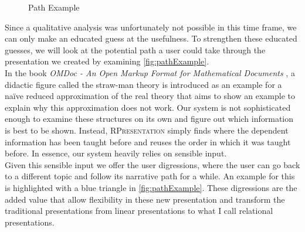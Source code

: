 \documentclass[twoside, 12pt]{article}
\newcommand{\sys}{\textsc{RPresentation}\xspace}
\begin{document}
\begin{figure}
\vspace{-28pt}
  \begin{center}
\vspace{-20pt}
  \caption{Path Example}
  \label{fig:pathExample}
\vspace{-24pt}
  \end{center}
\end{figure}

Since a qualitative analysis was unfortunately not possible in this time frame, we can only make an educated guess at the usefulness. To strengthen these educated guesses, we will look at the potential path a user could take through the presentation we created by examining \autoref{fig:pathExample}.\\

In the book \textit{OMDoc - An Open Markup Format for Mathematical Documents} \cite{URL:omdocspec}, a didactic figure called the straw-man theory is introduced as an example for a naïve reduced approximation of the real theory that aims to show an example to explain why this approximation does not work. Our system is not sophisticated enough to examine these structures on its own and figure out which information is best to be shown. Instead, \sys simply finds where the dependent information has been taught before and reuses the order in which it was taught before. In essence, our system heavily relies on sensible input.\\

Given this sensible input we offer the user digressions, where the user can go back to a different topic and follow its narrative path for a while. An example for this is highlighted with a blue triangle in \autoref{fig:pathExample}. These digressions are the added value that allow flexibility in these new presentation and transform the traditional presentations from linear presentations to what I call relational presentations.
\end{document}
